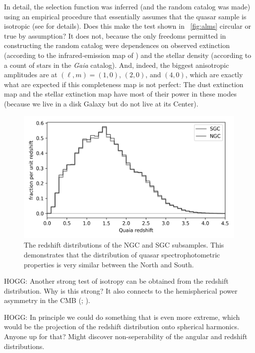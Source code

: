 \documentclass[modern]{aastex631}
\newlength{\figurewidth}
\newcommand{\figref}[1]{\figurename~\ref{#1}}
\begin{document}
In detail, the selection function was inferred (and the random catalog was made) using an empirical procedure that essentially assumes that the quasar sample is isotropic (see \citealt{quaia} for details).
Does this make the test shown in \figref{fig:alms} circular or true by assumption?
It does not, because the only freedoms permitted in constructing the random catalog were dependences on observed extinction (according to the infrared-emission map of \citealt{sfd}) and the stellar density (according to a count of stars in the \textsl{Gaia} catalog).
And, indeed, the biggest anisotropic amplitudes are at $(\ell,m)=(1,0)$, $(2,0)$, and $(4,0)$, which are exactly what are expected if this completeness map is not perfect:
The dust extinction map and the stellar extinction map have most of their power in these modes (because we live in a disk Galaxy but do not live at its Center).

\begin{figure}[t!]
  \begin{mdframed}
  \color{captiongray}
  \begin{center}
    \includegraphics[width=\figurewidth]{notebooks/zhist.png}
  \end{center}
    \caption{The redshift distributions of the NGC and SGC subsamples. This demonstrates that the distribution of quasar spectrophotometric properties is very similar between the North and South.\label{fig:zhist}}
  \end{mdframed}
\end{figure}
HOGG: Another strong test of isotropy can be obtained from the redshift distribution.
Why is this strong?
It also connects to the hemispherical power asymmetry in the CMB (\citealt{wmapanisotropy}; \citealt{planckanisotropy}).

HOGG: In principle we could do something that is even more extreme, which would be the projection of the redshift distribution onto spherical harmonics. Anyone up for that? Might discover non-seperability of the angular and redshift distributions.
\end{document}
